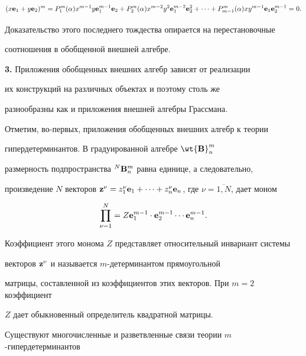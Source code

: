 $$


(x{\bold e}_1+ y{\bold e}_2)^m=


P_1^m(\alpha)x^{m-1}y{\bold e}_1^{m-1}{\bold e}_2+


P_2^m(\alpha)x^{m-2}y^2{\bold e}_1^{m-2}{\bold e}_2^2 +


\dotsb + P_{m-1}^m(\alpha)xy^{m-1}{\bold e}_1{\bold e}^{m-1}_2=0.


$$


Доказательство этого последнего тождества опирается на перестановочные


соотношения в обобщенной внешней алгебре.


\medskip





{\bf 3.} Приложения обобщенных внешних алгебр зависят от реализации


их конструкций на различных объектах и поэтому столь же


разнообразны как и приложения внешней алгебры Грассмана.





Отметим, во-первых, приложения обобщенных внешних алгебр к теории


гипердетерминантов. В градуированной алгебре $\wt{\bold B}_n^m$


размерность подпространства $^N{\bold B}_n^m$ равна единице, а следовательно,


произведение $N$ векторов ${\bold z}^{\nu}= z_1^{\nu}{\bold e}_1+\dotsb +


z_n^{\nu}{\bold e}_n$, где $\nu=\overline{1,N}$, дает моном


$$


\prod_{\nu=1}^N = Z{\bold e}_1^{m-1}\cdot {\bold e}_2^{m-1}


\dotsb {\bold e}_n^{m-1}.


$$


Коэффициент этого монома $Z$ представляет относительный инвариант системы


векторов ${\bold z}^{\nu}$ и называется $m$-детерминантом прямоугольной


матрицы, составленной из коэффициентов этих векторов. При $m=2$ коэффициент


$Z$ дает обыкновенный определитель квадратной матрицы.





Существуют многочисленные и разветвленные связи теории $m$-гипердетерминантов


